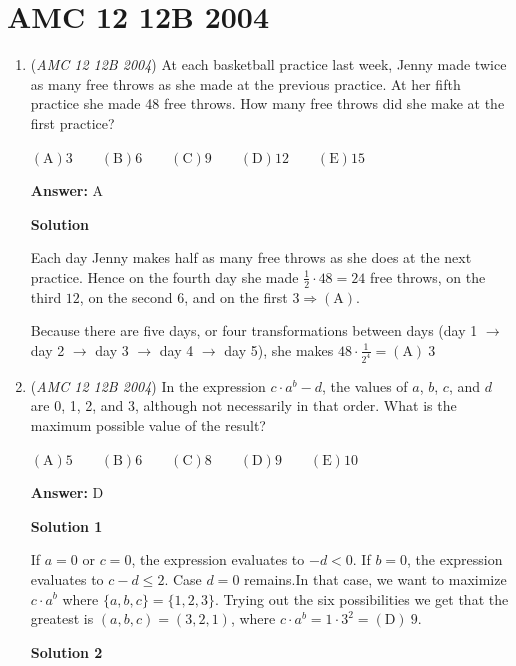 \section{AMC 12 12B 2004}
        \begin{enumerate}
        	\item (\textit{AMC 12 12B 2004}) At each basketball practice last week, Jenny made twice as many free throws as she made at the previous practice. At her fifth practice she made 48 free throws. How many free throws did she make at the first practice? 


 $(\mathrm {A}) 3\qquad (\mathrm {B}) 6 \qquad (\mathrm {C}) 9 \qquad (\mathrm {D}) 12 \qquad (\mathrm {E}) 15$

 \textbf{Answer: }A



\textbf{Solution}

Each day Jenny makes half as many free throws as she does at the next practice. Hence on the fourth day she made $\frac{1}{2} \cdot 48 = 24$ free throws, on the third $12$, on the second $6$, and on the first $3 \Rightarrow \mathrm{(A)}$.

 Because there are five days, or four transformations between days (day 1 $\rightarrow$ day 2 $\rightarrow$ day 3 $\rightarrow$ day 4 $\rightarrow$ day 5), she makes $48 \cdot \frac{1}{2^4} = \boxed{\mathrm{(A)}\ 3}$



	\item (\textit{AMC 12 12B 2004}) In the expression $c\cdot a^b-d$, the values of $a$, $b$, $c$, and $d$ are 0, 1, 2, and 3, although not necessarily in that order. What is the maximum possible value of the result?


 $(\mathrm {A}) 5\qquad (\mathrm {B}) 6 \qquad (\mathrm {C}) 8 \qquad (\mathrm {D}) 9 \qquad (\mathrm {E}) 10$

 \textbf{Answer: }D



\textbf{Solution 1}

If $a=0$ or $c=0$, the expression evaluates to $-d<0$. 
If $b=0$, the expression evaluates to $c-d\leq 2$. 
Case $d=0$ remains.In that case, we want to maximize $c\cdot a^b$ where $\{a,b,c\}=\{1,2,3\}$. Trying out the six possibilities we get that the greatest is $(a,b,c)=(3,2,1)$, where $c\cdot a^b=1\cdot 3^2=\boxed{\mathrm{(D)}\ 9}$.

 



\textbf{Solution 2}


\end{enumerate}

